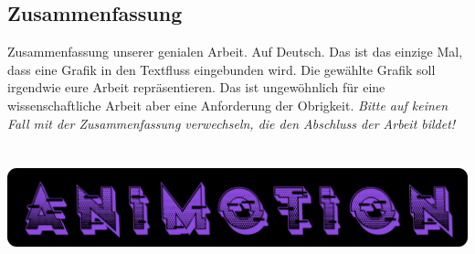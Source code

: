 \newpage
\begin{spacing}{1}
    \chapter*{Zusammenfassung}
\end{spacing}
Zusammenfassung unserer genialen Arbeit. Auf Deutsch.
Das ist das einzige Mal, dass eine Grafik in den Textfluss eingebunden wird.
Die gewählte Grafik soll irgendwie eure Arbeit repräsentieren.
Das ist ungewöhnlich für eine wissenschaftliche Arbeit aber eine Anforderung der Obrigkeit.
\emph{Bitte auf keinen Fall mit der Zusammenfassung verwechseln, die den Abschluss der Arbeit bildet!}
\\
\\
\\
\includegraphics[width=1\textwidth]{pics/animotionlogo.png}
